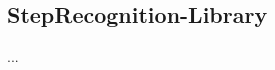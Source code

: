 \documentclass[../entwurf.tex]{subfiles}
\begin{document}
\subsection{StepRecognition-Library}
...
\end{document}
